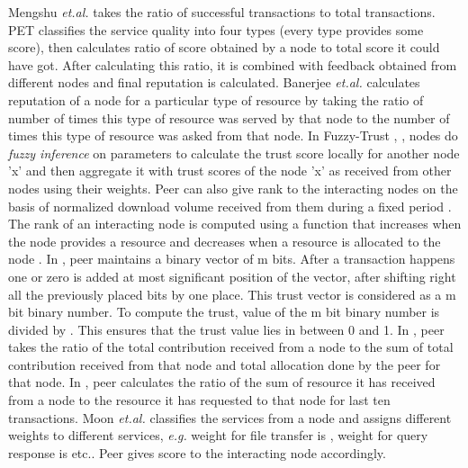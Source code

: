 \documentclass{IEEEtran}
\begin{document}
Mengshu \emph{et.al.} \cite{A trust model of p2p system based on confirmation
theory} takes the ratio of successful transactions to total transactions. PET
\cite {Pet} classifies the service quality into four types (every type provides
some score), then calculates ratio of score obtained by a node to total score it
could have got. After calculating this ratio, it is combined with feedback
obtained from different nodes and final reputation is calculated. Banerjee
\emph{et.al.} \cite{reciprocal} calculates reputation of a node for a particular
type of resource by taking the ratio of number of times this type of resource
was served by that node to the number of times this type of resource was asked from that
node. In Fuzzy-Trust \cite{FuzzyTrust}, \cite{fuzzy approach}, nodes do
\emph{fuzzy inference} on parameters to calculate the trust score locally for
another node 'x' and then aggregate it with trust scores of the node 'x' as
received from other nodes using their weights. Peer can also give rank to the
interacting nodes on the basis of normalized download volume received from them during a fixed period \cite{multi lavel tit for tat}.  The rank of an interacting node is computed using a function that increases when the node provides a resource and decreases when a resource is allocated to the node \cite{Ranking-based Optimal Resource Allocation}. In \cite{A Reputation-based Trust Management}, peer maintains a binary vector of m bits. After a transaction happens one or zero is added at most significant position of the vector, after shifting right all the previously placed bits by one place. This trust vector is considered as a m bit binary number. To compute the trust, value of the m 
bit binary number is divided by . This ensures that the trust value lies in between 0 and 1. In \cite{R2P}, peer takes the ratio of the total contribution received from a node to the sum of total contribution received from that node and total allocation done by the peer for that node. In \cite{Reputation-based resource allocation}, peer calculates the ratio of the sum of resource it has received from a node to the resource it has requested  to that node for last ten transactions. Moon \emph{et.al.} \cite{Point Based} classifies the services from a node and assigns  different weights to different services, \emph{e.g.}  weight for file transfer is , weight for query response is  etc.. Peer gives score to the interacting node accordingly.
\end{document}
